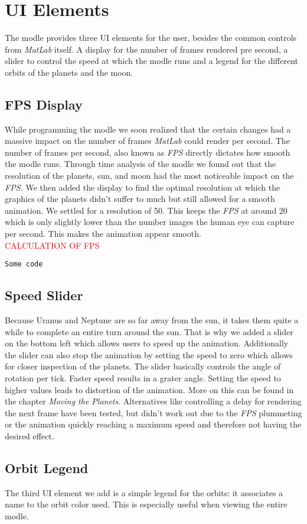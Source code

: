 \chapter{UI Elements}

The modle provides three UI elements for the user, besides the common controls from {\em MatLab} itself. A display for the number of frames rendered pre second, a slider to control the speed at which the modle runs and a legend for the different orbits of the planets and the moon.

\section{FPS Display}
While programming the modle we soon realized that the certain changes had a massive impact on the number of frames {\em MatLab} could render per second. The number of frames per second, also known as {\em FPS} directly dictates how smooth the modle runs. Through time analysis of the modle we found out that the resolution of the planets, sun, and moon had the most noticeable impact on the {\em FPS.} We then added the display to find the optimal resolution at which the graphics of the planets didn't suffer to much but still allowed for a smooth animation. We settled for a resolution of 50. This keeps the {\em FPS} at around 20 which is only slightly lower than the number images the human eye can capture per second. This makes the animation appear smooth.\\

\textcolor{red}{CALCULATION OF FPS}
\begin{framed}\begin{verbatim}
Some code
\end{verbatim}\end{framed}


\section{Speed Slider}
Because Uranus and Neptune are so far away from the sun, it takes them quite a while to complete an entire turn around the sun. That is why we added a slider on the bottom left which allows users to speed up the animation. Additionally the slider can also stop the animation by setting the speed to zero which allows for closer inspection of the planets. The slider basically controls the angle of rotation per tick. Faster speed results in a grater angle. Setting the speed to higher values leads to distortion of the animation. More on this can be found in the chapter {\em Moving the Planets}. Alternatives like controlling a delay for rendering the next frame have been tested, but didn't work out due to the {\em FPS} plummeting or the animation quickly reaching a maximum speed and therefore not having the desired effect.

\section{Orbit Legend}
The third UI element we add is a simple legend for the orbits: it associates a name to the orbit color used. This is especially useful when viewing the entire modle.